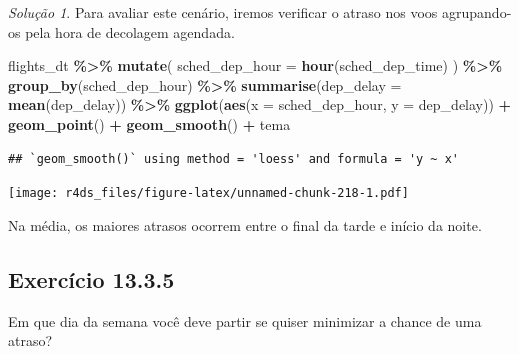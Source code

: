 \documentclass[
]{latex/krantz}
\newenvironment{Shaded}{\begin{snugshade}}{\end{snugshade}}
\newcommand{\AttributeTok}[1]{\textcolor[rgb]{0.13,0.29,0.53}{#1}}
\newcommand{\FunctionTok}[1]{\textcolor[rgb]{0.13,0.29,0.53}{\textbf{#1}}}
\newcommand{\NormalTok}[1]{#1}
\newcommand{\SpecialCharTok}[1]{\textcolor[rgb]{0.81,0.36,0.00}{\textbf{#1}}}
\theoremstyle{definition}
\theoremstyle{definition}
\theoremstyle{definition}
\theoremstyle{definition}
\theoremstyle{remark}
\newtheorem*{solution}{Solução}
\begin{document}
\begin{solution}
Para avaliar este cenário, iremos verificar o atraso nos voos agrupando-os pela hora de decolagem agendada.

\begin{Shaded}
\begin{Highlighting}[]
\NormalTok{flights\_dt }\SpecialCharTok{\%\textgreater{}\%}
  \FunctionTok{mutate}\NormalTok{(}
    \AttributeTok{sched\_dep\_hour =} \FunctionTok{hour}\NormalTok{(sched\_dep\_time)}
\NormalTok{  ) }\SpecialCharTok{\%\textgreater{}\%}
  \FunctionTok{group\_by}\NormalTok{(sched\_dep\_hour) }\SpecialCharTok{\%\textgreater{}\%}
  \FunctionTok{summarise}\NormalTok{(}\AttributeTok{dep\_delay =} \FunctionTok{mean}\NormalTok{(dep\_delay)) }\SpecialCharTok{\%\textgreater{}\%}
  \FunctionTok{ggplot}\NormalTok{(}\FunctionTok{aes}\NormalTok{(}\AttributeTok{x =}\NormalTok{ sched\_dep\_hour, }\AttributeTok{y =}\NormalTok{ dep\_delay)) }\SpecialCharTok{+}
    \FunctionTok{geom\_point}\NormalTok{() }\SpecialCharTok{+}
    \FunctionTok{geom\_smooth}\NormalTok{() }\SpecialCharTok{+}
\NormalTok{    tema}
\end{Highlighting}
\end{Shaded}

\begin{verbatim}
## `geom_smooth()` using method = 'loess' and formula = 'y ~ x'
\end{verbatim}

\texttt{[image: r4ds\_files/figure-latex/unnamed-chunk-218-1.pdf]}

Na média, os maiores atrasos ocorrem entre o final da tarde e início da noite.
\end{solution}

\hypertarget{exr13-3-5}{%
\subsection*{Exercício 13.3.5}\label{exr13-3-5}}

Em que dia da semana você deve partir se quiser minimizar a chance de uma atraso?
\end{document}
